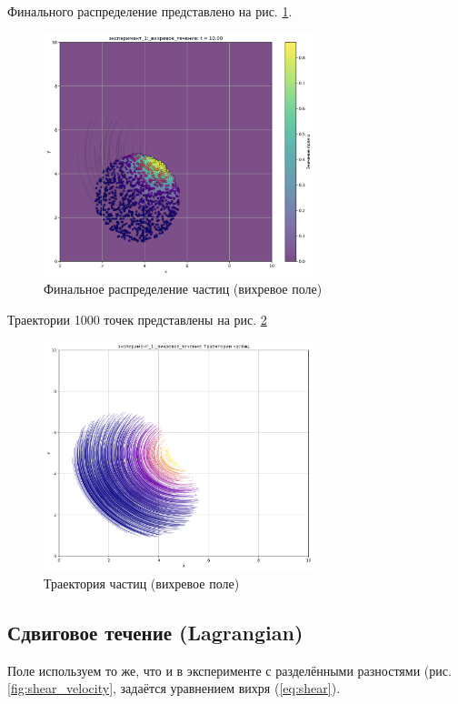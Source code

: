 Финального распределение представлено на рис. \ref{fig:lg_vortex_finall}.
\begin{figure}
	\centering
	\includegraphics[width=0.7\textwidth]{imgs/lg/эксперимент_1:_вихревое_течение_t10.00.png}
	\caption{Финальное распределение частиц (вихревое поле)}
	\label{fig:lg_vortex_finall}
\end{figure}
Траектории 1000 точек представлены на рис. \ref{fig:lg_vortex_tr}
\begin{figure}
	\centering
	\includegraphics[width=0.7\textwidth]{imgs/lg/эксперимент_1:_вихревое_течение_trajectories.png}
	\caption{Траектория частиц (вихревое поле)}
	\label{fig:lg_vortex_tr}
\end{figure}

\newpage
\subsection{Сдвиговое течение (Lagrangian)}

Поле используем то же, что и в эксперименте с разделёнными разностями (рис. \ref{fig:shear_velocity},  задаётся уравнением вихря (\ref{eq:shear}).

